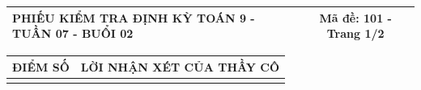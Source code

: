 \documentclass[12pt,a4paper]{article}
\begin{document}
\pagestyle{empty}

\noindent
\begin{tabularx}{\linewidth}{|X|c|}
\hline
\textbf{PHIẾU KIỂM TRA ĐỊNH KỲ TOÁN 9 - TUẦN 07 - BUỔI 02} & \textbf{Mã đề: 101 - Trang 1/2} \\
\hline
\end{tabularx}

\vspace{1.0mm}

\noindent
\begin{tabularx}{\linewidth}{|p{3.2cm}|X|}
\hline
\centering\textbf{ĐIỂM SỐ} & \centering\textbf{LỜI NHẬN XÉT CỦA THẦY CÔ} \tabularnewline
\hline
\rule{0pt}{1.8cm} & \tabularnewline
\hline
\end{tabularx}
\end{document}
